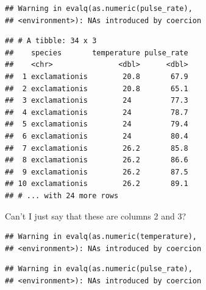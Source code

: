 \documentclass[]{tufte-book}
\newenvironment{Shaded}{}{}
\newcommand{\DecValTok}[1]{\textcolor[rgb]{0.25,0.63,0.44}{#1}}
\newcommand{\KeywordTok}[1]{\textcolor[rgb]{0.00,0.44,0.13}{\textbf{#1}}}
\newcommand{\NormalTok}[1]{#1}
\newcommand{\OperatorTok}[1]{\textcolor[rgb]{0.40,0.40,0.40}{#1}}
\newcommand{\StringTok}[1]{\textcolor[rgb]{0.25,0.44,0.63}{#1}}
\theoremstyle{definition}
\theoremstyle{definition}
\theoremstyle{definition}
\theoremstyle{remark}
\begin{document}
\begin{verbatim}
## Warning in evalq(as.numeric(pulse_rate),
## <environment>): NAs introduced by coercion
\end{verbatim}

\begin{verbatim}
## # A tibble: 34 x 3
##    species       temperature pulse_rate
##    <chr>               <dbl>      <dbl>
##  1 exclamationis        20.8       67.9
##  2 exclamationis        20.8       65.1
##  3 exclamationis        24         77.3
##  4 exclamationis        24         78.7
##  5 exclamationis        24         79.4
##  6 exclamationis        24         80.4
##  7 exclamationis        26.2       85.8
##  8 exclamationis        26.2       86.6
##  9 exclamationis        26.2       87.5
## 10 exclamationis        26.2       89.1
## # ... with 24 more rows
\end{verbatim}

Can't I just say that these are columns 2 and 3?

\begin{Shaded}
\end{Shaded}

\begin{verbatim}
## Warning in evalq(as.numeric(temperature),
## <environment>): NAs introduced by coercion
\end{verbatim}

\begin{verbatim}
## Warning in evalq(as.numeric(pulse_rate),
## <environment>): NAs introduced by coercion
\end{verbatim}
\end{document}
